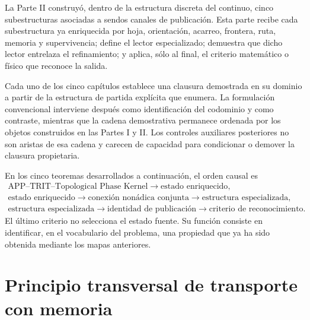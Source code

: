 
\ifdefined\HMTSucesoraStructureTrace
\fi

La Parte II construyó, dentro de la estructura discreta del continuo, cinco
subestructuras asociadas a sendos canales de publicación. Esta parte recibe
cada subestructura ya
enriquecida por hoja, orientación, acarreo, frontera, ruta, memoria y
supervivencia; define el lector especializado; demuestra que dicho lector
entrelaza el refinamiento; y aplica, sólo al final, el criterio matemático o
físico que reconoce la salida.

Cada uno de los cinco capítulos establece una clausura demostrada en su
dominio a partir de la estructura de partida explícita que enumera. La
formulación convencional interviene después como identificación del
codominio y como contraste, mientras que la cadena demostrativa permanece
ordenada por los objetos construidos en las Partes I y II. Los controles
auxiliares posteriores no son aristas de esa cadena y carecen de capacidad
para condicionar o demover la clausura propietaria.

En los cinco teoremas desarrollados a continuación, el orden causal es
\begin{equation}\label{eq:realizaciones-orden-causal}
 \begin{gathered}
 \text{APP--TRIT--Topological Phase Kernel}
 \longrightarrow \text{estado enriquecido},\\
 \text{estado enriquecido}
 \longrightarrow \text{conexión nonádica conjunta}
 \longrightarrow \text{estructura especializada},\\
 \text{estructura especializada}
 \longrightarrow \text{identidad de publicación}
 \longrightarrow \text{criterio de reconocimiento}.
 \end{gathered}
\end{equation}
El último criterio no selecciona el estado fuente. Su función consiste en
identificar, en el vocabulario del problema, una propiedad que ya ha sido
obtenida mediante los mapas anteriores.

\section*{Principio transversal de transporte con memoria}

